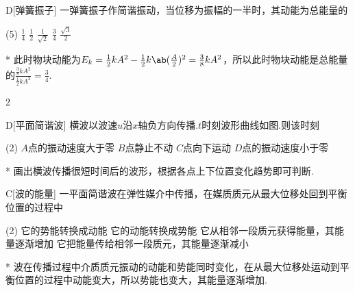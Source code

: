 \begin{choice}{D}[弹簧振子]
    一弹簧振子作简谐振动，当位移为振幅的一半时，其动能为总能量的
    \begin{tasks}(5)
        \task $\frac{1}{4}$
        \task $\frac{1}{2}$
        \task $\frac{1}{\sqrt{2}}$
        \task $\frac{3}{4}$
        \task $\frac{\sqrt{3}}{2}$
    \end{tasks}
\end{choice}
\begin{solution}*
    此时物块动能为$E_k=\frac{1}{2}kA^2-\frac{1}{2}k\ab(\frac{A}{2})^2=\frac{3}{8}kA^2$，所以此时物块动能是总能量的$\frac{\frac{3}{8}kA^2}{\frac{1}{2}kA^2}=\frac{3}{4}$.
\end{solution}

\begin{paracol}{2}
\begin{choice}{D}[平面简谐波]
    横波以波速$u$沿$x$轴负方向传播.$t$时刻波形曲线如图.则该时刻
    \begin{tasks}(2)
        \task $A$点的振动速度大于零
        \task $B$点静止不动
        \task $C$点向下运动
        \task $D$点的振动速度小于零
    \end{tasks}
\end{choice}
\switchcolumn\centering
\vfill
{}
\vfill
\end{paracol}
\begin{solution}*
    画出横波传播很短时间后的波形，根据各点上下位置变化趋势即可判断.
\end{solution}

\begin{choice}{C}[波的能量]
    一平面简谐波在弹性媒介中传播，在媒质质元从最大位移处回到平衡位置的过程中
    \begin{tasks}(2)
        \task 它的势能转换成动能
        \task 它的动能转换成势能
        \task 它从相邻一段质元获得能量，其能量逐渐增加
        \task 它把能量传给相邻一段质元，其能量逐渐减小
    \end{tasks}
\end{choice}
\begin{solution}*
    波在传播过程中介质质元振动的动能和势能同时变化，在从最大位移处运动到平衡位置的过程中动能变大，所以势能也变大，其能量逐渐增加.
\end{solution}

